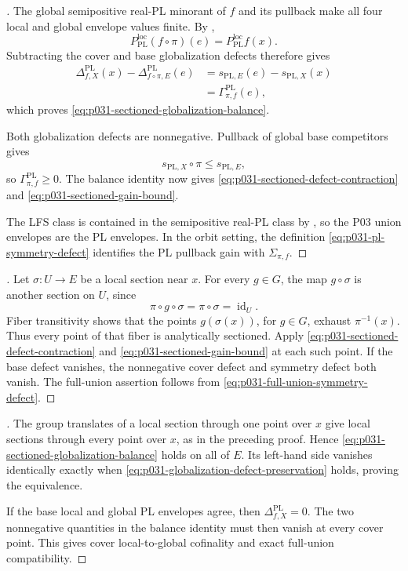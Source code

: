 \begin{proof}[]
The global semipositive real-PL minorant of $f$ and its pullback make all
four local and global envelope values finite.  By
,
\[
 P_{\mathrm{PL}}^{\mathrm{loc}}(f\circ\pi)(e)
     =P_{\mathrm{PL}}^{\mathrm{loc}}f(x).
\]
Subtracting the cover and base globalization defects therefore gives
\begin{align*}
 \Delta^{\mathrm{PL}}_{f,X}(x)
  -\Delta^{\mathrm{PL}}_{f\circ\pi,E}(e)
   &=s_{\mathrm{PL},E}(e)-s_{\mathrm{PL},X}(x)\\
   &=\Gamma^{\mathrm{PL}}_{\pi,f}(e),
\end{align*}
which proves \eqref{eq:p031-sectioned-globalization-balance}.

Both globalization defects are nonnegative.  Pullback of global base
competitors gives
\[
                 s_{\mathrm{PL},X}\circ\pi
                       \leq s_{\mathrm{PL},E},
\]
so $\Gamma^{\mathrm{PL}}_{\pi,f}\geq0$.  The balance identity now gives
\eqref{eq:p031-sectioned-defect-contraction} and
\eqref{eq:p031-sectioned-gain-bound}.

The LFS class is contained in the semipositive real-PL class by
\cite[Definition~7.8 and \S7.9]{GJR26}, so the P03 union envelopes are the
PL envelopes.  In the orbit setting, the definition
\eqref{eq:p031-pl-symmetry-defect} identifies the PL pullback gain with
$\Sigma_{\pi,f}$.
\end{proof}

\begin{proof}[]
Let $\sigma:U\to E$ be a local section near $x$.  For every $g\in G$, the
map $g\circ\sigma$ is another section on $U$, since
\[
                         \pi\circ g\circ\sigma
                            =\pi\circ\sigma
                            =\operatorname{id}_U.
\]
Fiber transitivity shows that the points $g(\sigma(x))$, for $g\in G$,
exhaust $\pi^{-1}(x)$.  Thus every point of that fiber is analytically
sectioned.  Apply \eqref{eq:p031-sectioned-defect-contraction} and
\eqref{eq:p031-sectioned-gain-bound} at each such point.  If the base defect
vanishes, the nonnegative cover defect and symmetry defect both vanish.
The full-union assertion follows from
\eqref{eq:p031-full-union-symmetry-defect}.
\end{proof}

\begin{proof}[]
The group translates of a local section through one point over $x$ give
local sections through every point over $x$, as in the preceding proof.
Hence \eqref{eq:p031-sectioned-globalization-balance} holds on all of $E$.
Its left-hand side vanishes identically exactly when
\eqref{eq:p031-globalization-defect-preservation} holds, proving the
equivalence.

If the base local and global PL envelopes agree, then
$\Delta^{\mathrm{PL}}_{f,X}=0$.  The two nonnegative quantities in the
balance identity must then vanish at every cover point.  This gives cover
local-to-global cofinality and exact full-union compatibility.
\end{proof}
